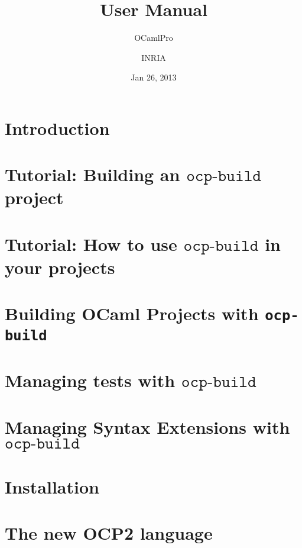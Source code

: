 \documentclass[11pt]{book}
\title{\ocpbuild{} User Manual}
\author{OCamlPro \and INRIA}
\date{Jan 26, 2013}
\newcommand{\cmd}[1]{$\texttt{#1}$}
\newcommand{\ocpbuild}{\cmd{ocp-build}}
\begin{document}
\maketitle
\thispagestyle{empty}
\tableofcontents

\chapter{Introduction}


\chapter{Tutorial: Building an \ocpbuild{} project}


\chapter{Tutorial: How to use \ocpbuild{} in your projects}


\chapter{Building OCaml Projects with {\tt ocp-build}}


\chapter{Managing tests with \ocpbuild{}}


\chapter{Managing Syntax Extensions with \ocpbuild{}}


\chapter{Installation}


\chapter{The new OCP2 language}


%
\end{document}
